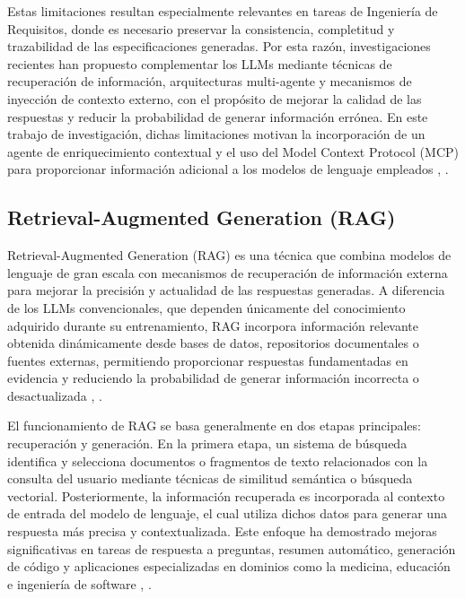 Estas limitaciones resultan especialmente relevantes en tareas de Ingeniería de Requisitos, donde es necesario preservar la consistencia, completitud y 
trazabilidad de las especificaciones generadas. Por esta razón, investigaciones recientes han propuesto complementar los LLMs mediante técnicas de 
recuperación de información, arquitecturas multi-agente y mecanismos de inyección de contexto externo, con el propósito de mejorar la calidad de las 
respuestas y reducir la probabilidad de generar información errónea. En este trabajo de investigación, dichas limitaciones motivan la incorporación 
de un agente de enriquecimiento contextual y el uso del Model Context Protocol (MCP) para proporcionar información adicional a los modelos de lenguaje 
empleados \cite{Wolf2026}, \cite{Umar2024}.

\subsection{Retrieval-Augmented Generation (RAG)}

Retrieval-Augmented Generation (RAG) es una técnica que combina modelos de lenguaje de gran escala con mecanismos de recuperación de información 
externa para mejorar la precisión y actualidad de las respuestas generadas. A diferencia de los LLMs convencionales, que dependen únicamente del 
conocimiento adquirido durante su entrenamiento, RAG incorpora información relevante obtenida dinámicamente desde bases de datos, repositorios 
documentales o fuentes externas, permitiendo proporcionar respuestas fundamentadas en evidencia y reduciendo la probabilidad de generar información 
incorrecta o desactualizada \cite{gao2023retrieval}, \cite{lewis2020retrieval}.

El funcionamiento de RAG se basa generalmente en dos etapas principales: recuperación y generación. En la primera etapa, un sistema de búsqueda 
identifica y selecciona documentos o fragmentos de texto relacionados con la consulta del usuario mediante técnicas de similitud semántica o búsqueda 
vectorial. Posteriormente, la información recuperada es incorporada al contexto de entrada del modelo de lenguaje, el cual utiliza dichos datos para 
generar una respuesta más precisa y contextualizada. Este enfoque ha demostrado mejoras significativas en tareas de respuesta a preguntas, resumen 
automático, generación de código y aplicaciones especializadas en dominios como la medicina, 
educación e ingeniería de software \cite{gao2023retrieval}, \cite{huang2026survey}.

